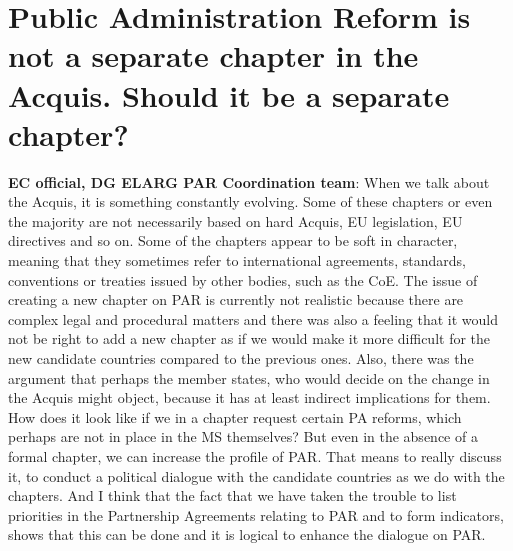 \section{Public Administration Reform is not a separate chapter in the Acquis. Should it be a separate chapter? }
\label{sec:chapter}
\textbf{EC official, DG ELARG PAR Coordination  team}: When we talk about the Acquis, it is something constantly evolving. Some of these chapters or even the majority are not necessarily based on hard Acquis, EU legislation, EU directives and so on. Some of the chapters appear to be soft in character, meaning that they sometimes refer to international agreements, standards, conventions or treaties issued by other bodies, such as the CoE. The issue of creating a new chapter on PAR is  currently not realistic because there are complex legal and procedural matters and there was also a feeling that it would not be right to add a new chapter as if we would make it more difficult for the new candidate countries compared to the previous ones. Also, there was the argument that perhaps the member states, who would decide on the change in the Acquis might object, because it has at least indirect implications for them. How does it look like if we in a chapter request certain PA reforms, which perhaps are not in place in the MS themselves? But even in the absence of a formal chapter, we can increase the profile of PAR. That means to really discuss it, to conduct a political dialogue with the candidate countries as we do with the chapters. And I think that the fact that we have taken the trouble to list priorities in the Partnership Agreements relating to  PAR and to form indicators, shows that this can be done and it is logical to  enhance the dialogue on PAR.\\
